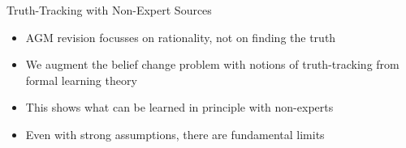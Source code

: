 \documentclass[10pt]{beamer}
\begin{document}
\begin{frame}{Truth-Tracking with Non-Expert Sources}
    \begin{itemize}
        \item AGM revision focusses on rationality, not on \alert{finding the
              truth}
        \item We augment the belief change problem with notions of
              truth-tracking from formal learning theory
        \item This shows what can be learned in principle with non-experts
        \item Even with strong assumptions, there are fundamental limits
    \end{itemize}
\end{frame}
\end{document}
